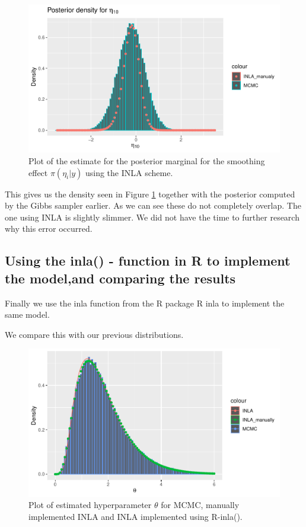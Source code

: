 \begin{figure}[h!]
    \centering
    \includegraphics[width=\textwidth]{Images/post_eta_inla.pdf}
    \caption{Plot of the estimate for the posterior marginal for the smoothing effect $\pi(\eta_i|y)$ using the INLA scheme.}
    \label{fig:post_eta_inla}
\end{figure}

This gives us the density seen in Figure \ref{fig:post_eta_inla} together with the posterior computed by the Gibbs sampler earlier. As we can see these do not completely overlap. The one using INLA is slightly slimmer. We did not have the time to further research why this error occurred.

\subsection{Using the inla() - function in R to implement the model,and comparing the results}

Finally we use the inla function from the R package R inla to implement the same model. 



We compare this with our previous distributions.
\begin{figure}[h]
    \centering
    \includegraphics[width=\textwidth]{Images/theta_comparison.pdf}
    \caption{Plot of estimated hyperparameter $\theta$ for MCMC, manually implemented INLA and INLA implemented using R-inla().}
    \label{fig:theta_comparison}
\end{figure}

